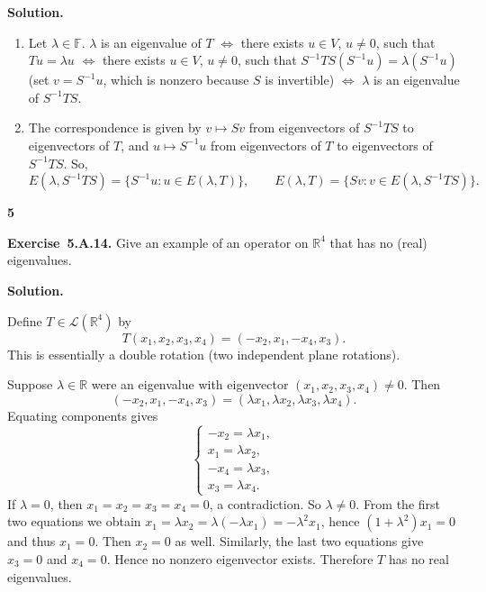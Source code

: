 \documentclass[11pt]{article}
\newcommand{\ProblemDivider}[1]{%
  \vspace{1.0em}
  \noindent\textbf{#1}\par
  \vspace{0.35em}
}
\newcommand{\ProblemAnnounce}{\noindent}
\newcommand{\SolutionAnnounce}{\noindent\textbf{Solution.}\par\medskip}
\newcommand{\Exercise}[1]{\textbf{Exercise~#1.}\;}
\newcommand{\R}{\mathbb{R}}
\newcommand{\F}{\mathbb{F}}
\newcommand{\Lmap}{\mathcal{L}}
\begin{document}
\begin{solutionBox}
\SolutionAnnounce
\doublespacing

\begin{enumerate}
  \item[(a)] Let \(\lambda \in \F\).  
  \(\lambda\) is an eigenvalue of \(T\)  
  \(\iff\) there exists \(u \in V\), \(u \neq 0\), such that \(Tu = \lambda u\)  
  \(\iff\) there exists \(u \in V\), \(u \neq 0\), such that \(S^{-1}TS (S^{-1}u) = \lambda (S^{-1}u)\) (set \(v = S^{-1}u\), which is nonzero because \(S\) is invertible)  
  \(\iff\) \(\lambda\) is an eigenvalue of \(S^{-1}TS\).

  \item[(b)] The correspondence is given by \(v \mapsto Sv\) from eigenvectors of \(S^{-1}TS\) to eigenvectors of \(T\), and \(u \mapsto S^{-1}u\) from eigenvectors of \(T\) to eigenvectors of \(S^{-1}TS\).  
  So,
  \[
  E(\lambda, S^{-1}TS) = \{ S^{-1}u : u \in E(\lambda, T) \}, \qquad
  E(\lambda, T) = \{ Sv : v \in E(\lambda, S^{-1}TS) \}.
  \]
\end{enumerate}

\end{solutionBox}

\ProblemDivider{5}

\begin{problemBox}
\ProblemAnnounce
\Exercise{5.A.14}
Give an example of an operator on \(\R^4\) that has no (real) eigenvalues.
\end{problemBox}

\begin{solutionBox}
\SolutionAnnounce
\doublespacing

Define \(T \in \Lmap(\R^4)\) by
\[
T(x_1, x_2, x_3, x_4) = (-x_2, x_1, -x_4, x_3).
\]
This is essentially a double rotation (two independent plane rotations).  

Suppose \(\lambda \in \R\) were an eigenvalue with eigenvector \((x_1,x_2,x_3,x_4) \neq 0\). Then
\[
(-x_2, x_1, -x_4, x_3) = (\lambda x_1, \lambda x_2, \lambda x_3, \lambda x_4).
\]
Equating components gives
\[
\begin{cases}
-x_2 = \lambda x_1,\\
x_1 = \lambda x_2,\\
-x_4 = \lambda x_3,\\
x_3 = \lambda x_4.
\end{cases}
\]
If \(\lambda = 0\), then \(x_1 = x_2 = x_3 = x_4 = 0\), a contradiction. So \(\lambda \neq 0\).  
From the first two equations we obtain \(x_1 = \lambda x_2 = \lambda(-\lambda x_1) = -\lambda^2 x_1\), hence \((1+\lambda^2)x_1 = 0\) and thus \(x_1 = 0\). Then \(x_2 = 0\) as well.  
Similarly, the last two equations give \(x_3 = 0\) and \(x_4 = 0\). Hence no nonzero eigenvector exists. Therefore \(T\) has no real eigenvalues.

\end{solutionBox}
\newpage
\end{document}
